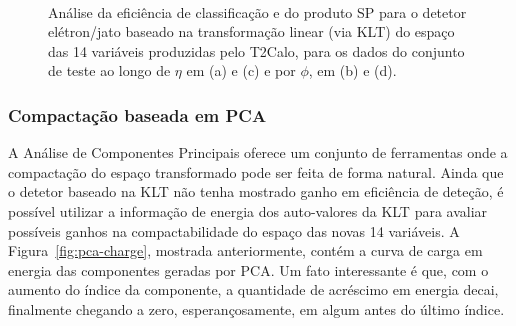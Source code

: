 \begin{figure}
\begin{center}
\mbox{%
}
\mbox{%
}
\end{center}
\caption{Análise da eficiência de classificação e do produto SP para 
o detetor elétron/jato baseado na transformação linear (via KLT) do espaço das
14 variáveis produzidas pelo T2Calo, para os dados do conjunto de teste ao
longo de $\eta$ em (a) e (c) e por $\phi$, em (b) e (d).}
\label{fig:pca-eta-phi}
\end{figure}




\subsubsection{Compactação baseada em PCA}

A Análise de Componentes Principais oferece um conjunto de ferramentas onde a
compactação do espaço transformado pode ser feita de forma natural. Ainda que
o detetor baseado na KLT não tenha mostrado ganho em eficiência de deteção, é
possível utilizar a informação de energia dos auto-valores da KLT para avaliar
possíveis ganhos na compactabilidade do espaço das novas 14 variáveis. A
Figura~\ref{fig:pca-charge}, mostrada anteriormente, contém a curva de carga
em energia das componentes geradas por PCA. Um fato interessante é que, com o
aumento do índice da componente, a quantidade de acréscimo em energia decai,
finalmente chegando a zero, esperançosamente, em algum antes do último
índice. 

